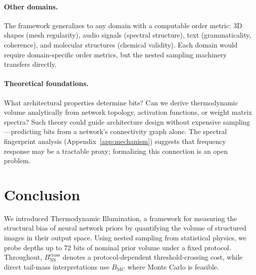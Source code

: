 \documentclass{article}
\begin{document}
\paragraph{Other domains.} The framework generalizes to any domain with a computable order metric: 3D shapes (mesh regularity), audio signals (spectral structure), text (grammaticality, coherence), and molecular structures (chemical validity). Each domain would require domain-specific order metrics, but the nested sampling machinery transfers directly.

\paragraph{Theoretical foundations.} What architectural properties determine bits? Can we derive thermodynamic volume analytically from network topology, activation functions, or weight matrix spectra? Such theory could guide architecture design without expensive sampling---predicting bits from a network's connectivity graph alone. The spectral fingerprint analysis (Appendix~\ref{app:mechanism}) suggests that frequency response may be a tractable proxy; formalizing this connection is an open problem.


\section{Conclusion}
\label{sec:conclusion}


We introduced Thermodynamic Illumination, a framework for measuring the structural bias of neural network priors by quantifying the volume of structured images in their output space. Using nested sampling from statistical physics, we probe depths up to 72 bits of nominal prior volume under a fixed protocol. Throughout, $B_{\text{NS}}^{\text{cross}}$ denotes a protocol-dependent threshold-crossing cost, while direct tail-mass interpretations use $B_{\text{MC}}$ where Monte Carlo is feasible.
\end{document}
